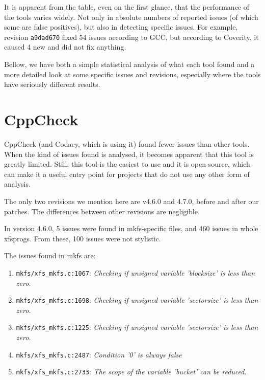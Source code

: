 It is apparent from the table, even on the first glance, that the performance
of the tools varies widely. Not only in absolute numbers of reported issues (of
which some are false positives), but also in detecting specific issues. For
example, revision {\tt a9dad670} fixed 54 issues according to GCC, but
according to Coverity, it caused 4 new and did not fix anything.

Bellow, we have both a simple statistical analysis of what each
tool found and a more detailed look at some specific issues and revisions,
especially where the tools have seriously different results.



\section{CppCheck}\label{chap:results:cppcheck}
CppCheck (and Codacy, which is using it) found fewer issues than other
tools. When the kind of issues found is analysed, it becomes apparent that
this tool is greatly limited. Still, this tool is the easiest to use and it is
open source, which can make it a useful entry point for projects that do not
use any other form of analysis.

The only two revisions we mention here are v4.6.0 and 4.7.0, before and after
our patches. The differences between other revisions are negligible.

In version 4.6.0, 5 issues were found in mkfs-specific
files, and 460 issues in whole xfsprogs. From these, 100 issues were not
stylistic.

The issues found in mkfs are:
\begin{enumerate}
	\item {\tt mkfs/xfs\_mkfs.c:1067}: {\em Checking if unsigned variable
		'blocksize' is less than zero.}
	\item {\tt mkfs/xfs\_mkfs.c:1698}: {\em Checking if unsigned variable
		'sectorsize' is less than zero.}
	\item {\tt mkfs/xfs\_mkfs.c:1225}: {\em Checking if unsigned variable
		'sectorsize' is less than zero.}
	\item {\tt mkfs/xfs\_mkfs.c:2487}: {\em Condition '0' is always false}
	\item {\tt mkfs/xfs\_mkfs.c:2733}: {\em The scope of the variable 'bucket'
		can be reduced.}
\end{enumerate}

